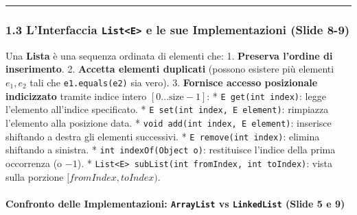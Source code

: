 \documentclass[11pt,a4paper]{article}
\newcommand{\passthrough}[1]{#1}
\begin{document}
\begin{center}\rule{0.5\linewidth}{0.5pt}\end{center}

\subsubsection{\texorpdfstring{1.3 L'Interfaccia
\texttt{List\textless{}E\textgreater{}} e le sue Implementazioni (Slide
8-9)}{1.3 L'Interfaccia List\textless E\textgreater{} e le sue Implementazioni (Slide 8-9)}}\label{linterfaccia-liste-e-le-sue-implementazioni-slide-8-9}

Una \textbf{Lista} è una sequenza ordinata di elementi che: 1.
\textbf{Preserva l'ordine di inserimento}. 2. \textbf{Accetta elementi
duplicati} (possono esistere più elementi \(e_1, e_2\) tali che
\passthrough{\lstinline!e1.equals(e2)!} sia vero). 3. \textbf{Fornisce
accesso posizionale indicizzato} tramite indice intero
\([0 \dots \text{size}-1]\): *
\passthrough{\lstinline!E get(int index)!}: legge l'elemento all'indice
specificato. * \passthrough{\lstinline!E set(int index, E element)!}:
rimpiazza l'elemento alla posizione data. *
\passthrough{\lstinline!void add(int index, E element)!}: inserisce
shiftando a destra gli elementi successivi. *
\passthrough{\lstinline!E remove(int index)!}: elimina shiftando a
sinistra. * \passthrough{\lstinline!int indexOf(Object o)!}: restituisce
l'indice della prima occorrenza (o \(-1\)). *
\passthrough{\lstinline!List<E> subList(int fromIndex, int toIndex)!}:
vista sulla porzione \([fromIndex, toIndex)\).

\paragraph{\texorpdfstring{Confronto delle Implementazioni:
\texttt{ArrayList} vs \texttt{LinkedList} (Slide 5 e
9)}{Confronto delle Implementazioni: ArrayList vs LinkedList (Slide 5 e 9)}}\label{confronto-delle-implementazioni-arraylist-vs-linkedlist-slide-5-e-9}
\end{document}
